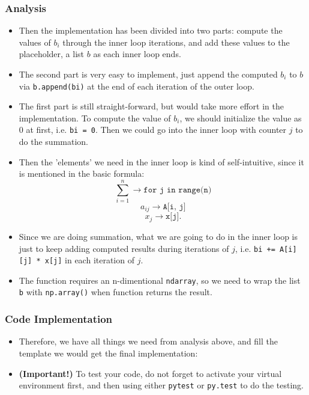 \subsubsection*{Analysis}
    \begin{itemize}
    \item Then the implementation has been divided into two parts: compute the values of $b_i$ through the inner loop iterations, and add these values to the placeholder, a list $b$ as each inner loop ends.
    \item The second part is very easy to implement, just append the computed $b_i$ to $b$ via \texttt{b.append(bi)} at the end of each iteration of the outer loop.
    \item The first part is still straight-forward, but would take more effort in the implementation. To compute the value of $b_i$, we should initialize the value as 0 at first, i.e. \texttt{bi = 0}. Then we could go into the inner loop with counter $j$ to do the summation. 
    \item Then the 'elements' we need in the inner loop is kind of self-intuitive, since it is mentioned in the basic formula:
      \[
        \sum_{i = 1}^{n} \to \texttt{for j in range(n)}
      \] 
       \[
         a_{ij} \to  \texttt{A[i, j]}
      \] 
      \[
        x_j \to  \texttt{x[j]}
      .\]     
    \item Since we are doing summation, what we are going to do in the inner loop is just to keep adding computed results during iterations of $j$, i.e.  \texttt{bi += A[i][j] * x[j]} in each iteration of $j$.
    \item The function requires an n-dimentional \texttt{ndarray}, so we need to wrap the list \texttt{b} with \texttt{np.array()} when function returns the result.
  \end{itemize}
\subsubsection*{Code Implementation} 
\begin{itemize}
    \item Therefore, we have all things we need from analysis above, and fill the template we would get the final implementation:
      
    \item \textbf{(Important!)} To test your code, do not forget to activate your virtual environment first, and then using either \texttt{pytest} or \texttt{py.test} to do the testing.
    \end{itemize}

